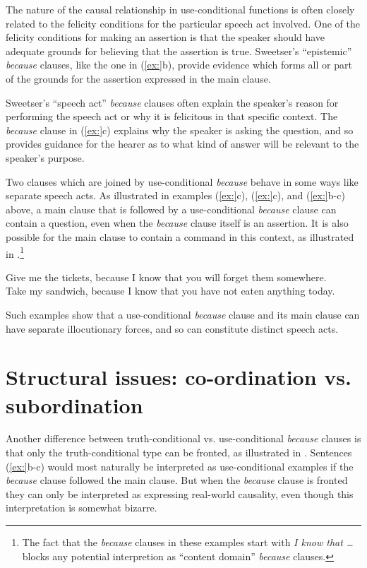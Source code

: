 The nature of the causal relationship in use-conditional functions is often closely related to the felicity conditions for the particular speech act involved. One of the felicity conditions for making an assertion is that the speaker should have adequate grounds for believing that the assertion is true. Sweetser’s “epistemic” \textit{because} clauses, like the one in (\ref{ex:}b), provide evidence which forms all or part of the grounds for the assertion expressed in the main clause.



Sweetser’s “speech act” \textit{because} clauses often explain the speaker’s reason for performing the speech act or why it is felicitous in that specific context. The \textit{because} clause in (\ref{ex:}c) explains why the speaker is asking the question, and so provides guidance for the hearer as to what kind of answer will be relevant to the speaker’s purpose.



Two clauses which are joined by use-conditional \textit{because} behave in some ways like separate speech acts. As illustrated in examples (\ref{ex:}c), (\ref{ex:}c), and (\ref{ex:}b-c) above, a main clause that is followed by a use-conditional \textit{because} clause can contain a question, even when the \textit{because} clause itself is an assertion. It is also possible for the main clause to contain a command in this context, as illustrated in .\footnote{The fact that the \textit{because} clauses in these examples start with \textit{I know that …} blocks any potential interpretion as “content domain” \textit{because} clauses.}


\ea
\ea Give me the tickets, because I know that you will forget them somewhere.\\
\ex Take my sandwich, because I know that you have not eaten anything today.
                       \z
\z


Such examples show that a use-conditional \textit{because} clause and its main clause can have separate illocutionary forces, and so can constitute distinct speech acts.


\section{Structural issues: co-ordination vs. subordination}\label{sec:18.4}

Another difference between truth-conditional vs. use-conditional \textit{because} clauses is that only the truth-conditional type can be fronted, as illustrated in . Sentences (\ref{ex:}b-c) would most naturally be interpreted as use-conditional examples if the \textit{because} clause followed the main clause. But when the \textit{because} clause is fronted they can only be interpreted as expressing real-world causality, even though this interpretation is somewhat bizarre.



